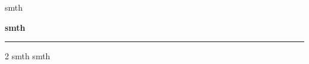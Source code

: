 \documentclass[12pt, a4paper]{article}
\begin{document}
\begin{flushright}
	smth
\end{flushright}

\begin{center}
	\textbf{smth}
	\vskip 5pt
	\hrule
	\vskip 15pt
\end{center}

\vskip 15pt
\begin{parcolumns}{2}
	\colchunk
	{
		smth
	}
	\colchunk
	{
		smth
	}
	\colplacechunks
\end{parcolumns}
\vskip 15pt
\end{document}
